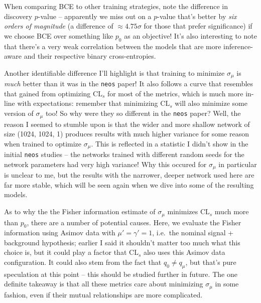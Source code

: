 \documentclass[
  11pt,
  numbers=noendperiod]{book}
\begin{document}
When comparing BCE to other training strategies, note the difference in
discovery \(p\)-value -- apparently we miss out on a \(p\)-value that's
better by \emph{six orders of magnitude} (a difference of
\(\approx 4.75\sigma\) for those that prefer significance) if we choose
BCE over something like \(p_0\) as an objective! It's also interesting
to note that there's a very weak correlation between the models that are
more inference-aware and their respective binary cross-entropies.

Another identifiable difference I'll highlight is that training to
minimize \(\sigma_{\mu}\) is \emph{much} better than it was in the
\texttt{neos} paper! It also follows a curve that resembles that gained
from optimizing \(\mathrm{CL}_s\) for most of the metrics, which is much
more in-line with expectations: remember that minimizing
\(\mathrm{CL}_s\) will also minimize some version of \(\sigma_{\mu}\)
too! So why were they so different in the \texttt{neos} paper? Well, the
reason I seemed to stumble upon is that the wider and more shallow
network of size (1024, 1024, 1) produces results with much higher
variance for some reason when trained to optimize \(\sigma_{\mu}\). This
is reflected in a statistic I didn't show in the initial \texttt{neos}
studies -- the networks trained with different random seeds for the
network parameters had very high variance! Why this occured for
\(\sigma_{\mu}\) in particular is unclear to me, but the results with
the narrower, deeper network used here are far more stable, which will
be seen again when we dive into some of the resulting models.

As to why the the Fisher information estimate of \(\sigma_{\mu}\)
minimizes \(\mathrm{CL}_s\) much more than \(p_0\), there are a number
of potential causes. Here, we evaluate the Fisher information using
Asimov data with \(\mu'=\gamma'=1\), i.e.~the nominal signal +
background hypothesis; earlier I said it shouldn't matter too much what
this choice is, but it could play a factor that \(\mathrm{CL}_s\) also
uses this Asimov data configuration. It could also stem from the fact
that \(q_0 \neq q_\mu\), but that's pure speculation at this point --
this should be studied further in future. The one definite takeaway is
that all these metrics care about minimizing \(\sigma_{\mu}\) in some
fashion, even if their mutual relationships are more complicated.
\end{document}
